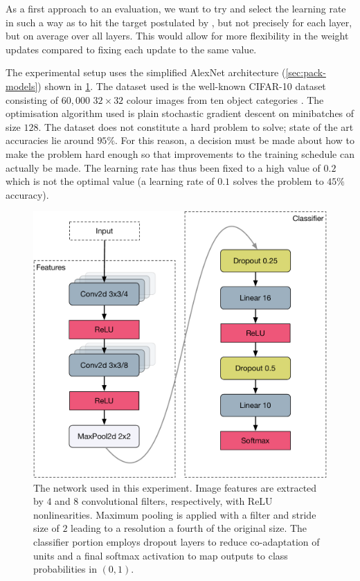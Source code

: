 As a first approach to an evaluation, we want to try and select the learning
rate in such a way as to hit the target postulated by
\citeauthor{karpathycs231n}, but not precisely for each layer, but on average
over all layers. This would allow for more flexibility in the weight updates
compared to fixing each update to the same value.

The experimental setup uses the simplified AlexNet architecture
(\cref{sec:pack-models}) shown in \cref{fig:alexnetmini}. The dataset used is
the well-known CIFAR-10 dataset consisting of $60,000$ $32\times32$ colour images
from ten object categories \citep{krizhevsky2009learning}. The optimisation
algorithm used is plain stochastic gradient descent on minibatches of size $128$. The
dataset does not constitute a hard problem to solve; state of the art accuracies
lie around $95\%$. For this reason, a decision must be made about how to make
the problem hard enough so that improvements to the training schedule can
actually be made. The learning rate has thus been fixed to a high value of $0.2$
which is not the optimal value (a learning rate of $0.1$ solves the problem to
$45\%$ accuracy).

\begin{figure}
    \centering
    \includegraphics[width=\linewidth]{gfx/diagrams/neural_network/alexnetmini.pdf}
    \caption[Simplified AlexNet architecture]{The network used in this
    experiment. Image features are extracted by $4$ and $8$ convolutional
    filters, respectively, with ReLU nonlinearities. Maximum pooling is applied
    with a filter and stride size of $2$ leading to a resolution a fourth of the
    original size. The classifier portion employs dropout layers to reduce
    co-adaptation of units and a final softmax activation to map outputs to
    class probabilities in $(0,1)$.}
    \label{fig:alexnetmini}
\end{figure}

